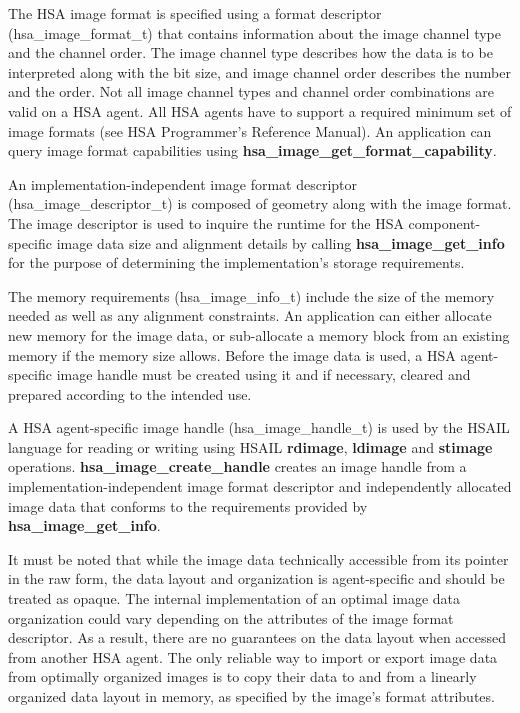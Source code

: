 \documentclass[final]{book}
\newcommand{\reffun}[1]{\textbf{#1}}
\newcommand{\reftyp}[1]{#1}
\newcommand{\refhsl}[1]{\reffun{#1}}
\begin{document}
The HSA image format is specified using a format descriptor
(\reftyp{hsa_image_format_t}) that contains information about the image channel
type and the channel order. The image channel type describes how the data is to
be interpreted along with the bit size, and image channel order describes the
number and the order. Not all image channel types and channel order combinations
are valid on a HSA agent. All HSA agents have to support a required minimum set
of image formats (see HSA Programmer's Reference Manual). An application can
query image format capabilities using \reffun{hsa_image_get_format_capability}.

An implementation-independent image format descriptor
(\reftyp{hsa_image_descriptor_t}) is composed of geometry along with the
image format. The image descriptor is used to inquire the runtime for the HSA
component-specific image data size and alignment details by calling
\reffun{hsa_image_get_info} for the purpose of determining the
implementation's storage requirements.

The memory requirements (\reftyp{hsa_image_info_t}) include the size of the
memory needed as well as any alignment constraints. An application can either
allocate new memory for the image data, or sub-allocate a memory block from an
existing memory if the memory size allows. Before the image data is used, a HSA
agent-specific image handle must be created using it and if necessary, cleared
and prepared according to the intended use.

A HSA agent-specific image handle (\reftyp{hsa_image_handle_t}) is used by the
HSAIL language for reading or writing using HSAIL \refhsl{rdimage},
\refhsl{ldimage} and \refhsl{stimage}
operations. \reffun{hsa_image_create_handle} creates an image handle from a
implementation-independent image format descriptor and independently allocated
image data that conforms to the requirements provided by
\reffun{hsa_image_get_info}.

It must be noted that while the image data technically accessible from its
pointer in the raw form, the data layout and organization is agent-specific and
should be treated as opaque. The internal implementation of an optimal image
data organization could vary depending on the attributes of the image format
descriptor. As a result, there are no guarantees on the data layout when
accessed from another HSA agent. The only reliable way to import or export image
data from optimally organized images is to copy their data to and from a
linearly organized data layout in memory, as specified by the image's format
attributes.
\end{document}
